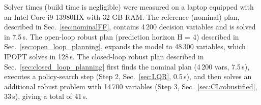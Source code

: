 
Solver times (build time is negligible) were measured on a laptop equipped with an Intel Core i9-13980HX with 32 GB RAM.
The reference (nominal) plan, described in Sec.~\ref{sec:nominalFF}, contains 4\,200 decision variables and is solved in 7.5\,s.
The open-loop robust plan (prediction horizon H = 4) described in Sec.~\ref{sec:open_loop_planning}, expands the model to 48\,300 variables, which IPOPT solves in 128\,s.
The closed-loop robust plan described in Sec.~\ref{sec:closed_loop_planning} first finds the nominal plan (4\,200 vars, 7.5\,s), executes a policy-search step (Step 2, Sec.~\ref{sec:LQR}, 0.5\,s), and then solves an additional robust problem with 14\,700 variables (Step 3, Sec.~\ref{sec:CLrobustified}, 33\,s), giving a total of 41\,s.

